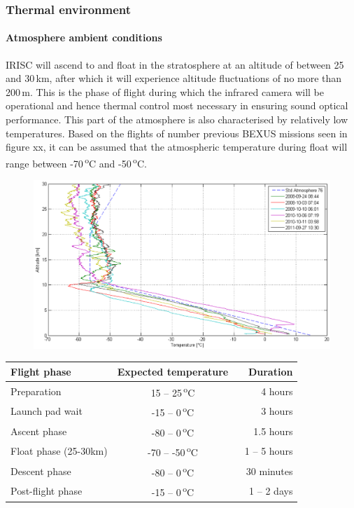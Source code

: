 \subsubsection{Thermal environment}
\paragraph{Atmosphere ambient conditions}
IRISC will ascend to and float in the stratosphere at an altitude of between 25 and 30\,km, after which it will experience altitude fluctuations of no more than 200\,m. This is the phase of flight during which the infrared camera will be operational and hence thermal control most necessary in ensuring sound optical performance. This part of the atmosphere is also characterised by relatively low temperatures. Based on the flights of number previous BEXUS missions seen in figure xx, it can be assumed that the atmospheric temperature during float will range between -70\,\textsuperscript{o}C and -50\,\textsuperscript{o}C. \\

	\begin{figure}[h!]
    \centering
    \includegraphics[scale=0.6]{4-experiment-design/img/mechanical/atmosphere.PNG}
	\label{fig: atmosphere}
	\end{figure}
	
\begin{center}
  \begin{tabular}{ | l | c | r | }
    \hline
    \textbf{Flight phase} & \textbf{Expected temperature} & \textbf{Duration} \\ \hline
    Preparation  & 15 – 25\,\textsuperscript{o}C & 4 hours \\ \hline
    Launch pad wait & -15 – 0\,\textsuperscript{o}C & 3 hours \\ \hline
    Ascent phase  & -80 – 0\,\textsuperscript{o}C & 1.5 hours \\ \hline
    Float phase (25-30km) & -70 – -50\,\textsuperscript{o}C & 1 – 5 hours \\ \hline 
    Descent phase  & -80 – 0\,\textsuperscript{o}C & ~ 30 minutes \\ \hline
    Post-flight phase & -15 – 0\,\textsuperscript{o}C & 1 – 2 days \\ \hline
  \end{tabular}
\end{center}

